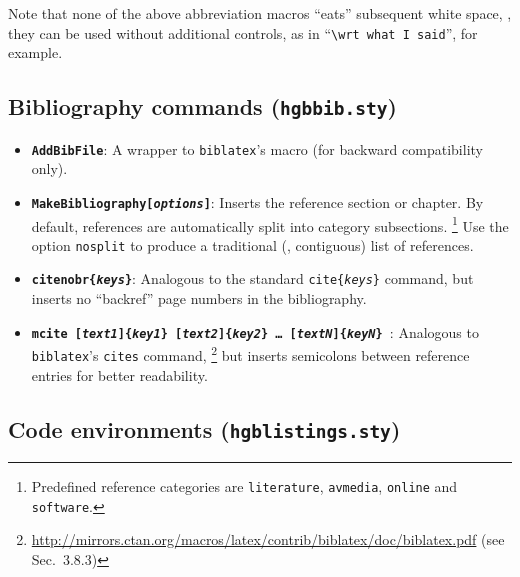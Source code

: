 \documentclass[english]{hgbarticle}
\begin{document}
\noindent
Note that none of the above abbreviation macros ``eats'' subsequent white
space, \ie, they can be used without additional controls, as in
``\verb!\wrt what I said!'', for example.

\subsection{Bibliography commands (\texttt{hgbbib.sty})}

\begin{itemize}
    \item
    \textbf{\texttt{{\bs}AddBibFile}}: A wrapper to \texttt{biblatex}'s
    \verb!! macro (for backward compatibility only).
    \item
    \textbf{\texttt{{\bs}MakeBibliography[\emph{options}]}}: Inserts the
    reference section or chapter. By default, references are automatically
    split into category subsections.%
    \footnote{Predefined reference categories are \texttt{literature},
        \texttt{avmedia}, \texttt{online} and \texttt{software}.}
    Use the option \texttt{nosplit} to produce a traditional (\ie,
    contiguous) list of references.
    \item
    \textbf{\texttt{{\bs}citenobr\{\emph{keys}\}}}: Analogous to the standard
    \texttt{{\bs}cite\{\emph{keys}\}} command, but inserts no ``backref''
    page numbers in the bibliography.
    \item
    \textbf{\texttt{{\bs}mcite%
        [\emph{text1}]\{\emph{key1}\}%
        [\emph{text2}]\{\emph{key2}\}%
        \ldots
        [\emph{textN}]\{\emph{keyN}\}%
    }}:
    Analogous to \texttt{bib\-la\-tex}'s \texttt{{\bs}cites} command,%
    \footnote{%
    \url{http://mirrors.ctan.org/macros/latex/contrib/biblatex/doc/biblatex.pdf}
    (see Sec.~3.8.3)} but inserts semicolons between reference entries for
    better readability.
\end{itemize}



\subsection{Code environments (\texttt{hgblistings.sty})}
\end{document}
